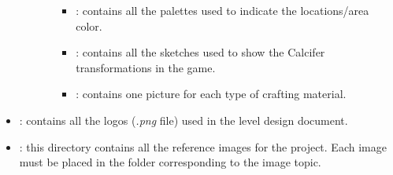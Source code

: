 \begin{itemize}
\begin{itemize}
\begin{itemize}
\begin{itemize}
        \item \textbf{}: contains all the palettes used to indicate the locations/area color.
        \item \textbf{}: contains all the sketches used to show the Calcifer transformations in the game.
        \item \textbf{}: contains one picture for each type of crafting material.
    \end{itemize}
\end{itemize}
\end{itemize}
    \item \textbf{}: contains all the logos (\textit{.png} file) used in the level design document.

    \item \textbf{}: this directory contains all the reference images for the project. Each image must be placed in the folder corresponding to the image topic.

\end{itemize}

